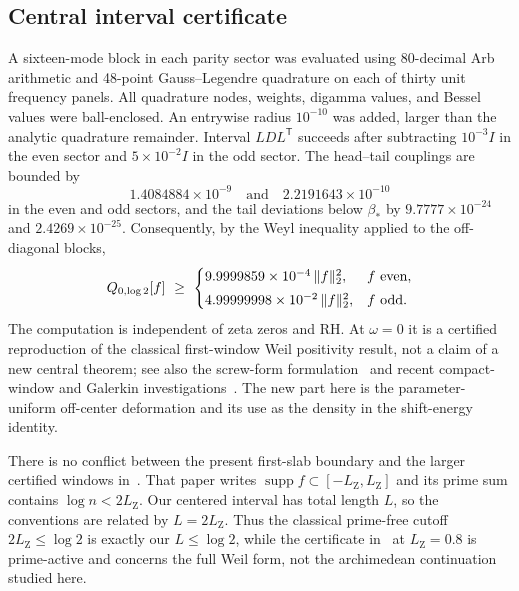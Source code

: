 \documentclass[11pt,a4paper]{article}
\newcommand{\supp}{\operatorname{supp}}
\newcommand{\LZ}{L_{\mathrm Z}}
\DeclarePairedDelimiter{\norm}{\lVert}{\rVert}
\theoremstyle{plain}
\theoremstyle{definition}
\numberwithin{equation}{section}
\begin{document}
\subsection{Central interval certificate}

A sixteen-mode block in each parity sector was evaluated using 80-decimal Arb
arithmetic and 48-point Gauss--Legendre quadrature on each of thirty unit
frequency panels. All quadrature nodes, weights, digamma values, and Bessel
values were ball-enclosed. An entrywise radius $10^{-10}$ was added, larger
than the analytic quadrature remainder. Interval $LDL^{\mathsf T}$ succeeds
after subtracting $10^{-3}I$ in the even sector and $5\times10^{-2}I$ in the
odd sector. The head--tail couplings are bounded by
\begin{equation}\label{eq:central-couplings}
1.4084884\times10^{-9}\quad\text{and}\quad2.2191643\times10^{-10}
\end{equation}
in the even and odd sectors, and the tail deviations below $\beta_*$ by
$9.7777\times10^{-24}$ and $2.4269\times10^{-25}$. Consequently, by the Weyl
inequality applied to the off-diagonal blocks,
\begin{equation}
Q_{0,\log2}[f]\ \ge\
\begin{cases}
9.9999859\times10^{-4}\,\norm f_2^2, & f\ \text{even},\\[1mm]
4.99999998\times10^{-2}\,\norm f_2^2, & f\ \text{odd}.
\end{cases}
\end{equation}
The computation is independent of zeta zeros and RH. At $\omega=0$ it is a
certified reproduction of the classical first-window Weil positivity result,
not a claim of a new central theorem; see also the screw-form
formulation~\cite{Suzuki2026screw} and recent compact-window and Galerkin
investigations~\cite{ConnesConsani2020,Zhu2026,Kim2026,Groskin2026}. The new
part here is the parameter-uniform off-center deformation and its use as the
density in the shift-energy identity.

There is no conflict between the present first-slab boundary and the larger
certified windows in~\cite{Zhu2026}. That paper writes
$\supp f\subset[-\LZ,\LZ]$ and its prime sum contains $\log n<2\LZ$. Our
centered interval has total length $L$, so the conventions are related by
$L=2\LZ$. Thus the classical prime-free cutoff $2\LZ\le\log2$ is exactly our
$L\le\log2$, while the certificate in~\cite{Zhu2026} at $\LZ=0.8$ is
prime-active and concerns the full Weil form, not the archimedean
continuation studied here.
\end{document}
